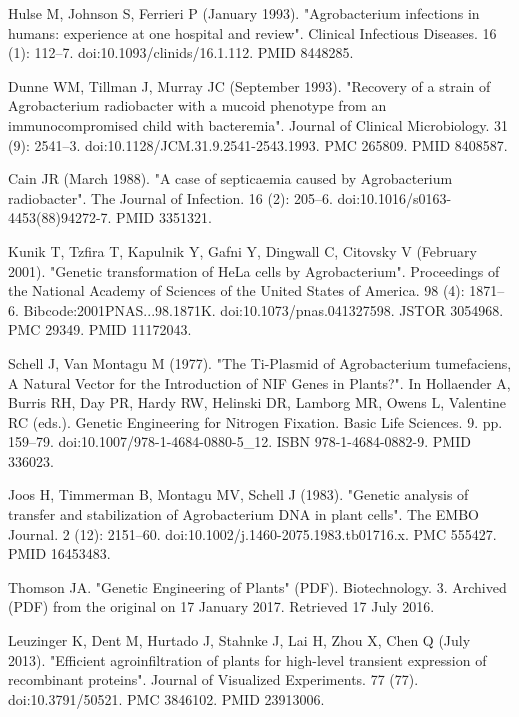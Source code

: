 \documentclass[11pt]{article}
\begin{document}
\begin{thebibliography}{3}
	 Hulse M, Johnson S, Ferrieri P (January 1993). "Agrobacterium infections in humans: experience at one hospital and review". Clinical Infectious Diseases. 16 (1): 112–7. doi:10.1093/clinids/16.1.112. PMID 8448285.
	
	 Dunne WM, Tillman J, Murray JC (September 1993). "Recovery of a strain of Agrobacterium radiobacter with a mucoid phenotype from an immunocompromised child with bacteremia". Journal of Clinical Microbiology. 31 (9): 2541–3. doi:10.1128/JCM.31.9.2541-2543.1993. PMC 265809. PMID 8408587.
	
	 Cain JR (March 1988). "A case of septicaemia caused by Agrobacterium radiobacter". The Journal of Infection. 16 (2): 205–6. doi:10.1016/s0163-4453(88)94272-7. PMID 3351321.
	
	 Kunik T, Tzfira T, Kapulnik Y, Gafni Y, Dingwall C, Citovsky V (February 2001). "Genetic transformation of HeLa cells by Agrobacterium". Proceedings of the National Academy of Sciences of the United States of America. 98 (4): 1871–6. Bibcode:2001PNAS...98.1871K. doi:10.1073/pnas.041327598. JSTOR 3054968. PMC 29349. PMID 11172043.
	
	 Schell J, Van Montagu M (1977). "The Ti-Plasmid of Agrobacterium tumefaciens, A Natural Vector for the Introduction of NIF Genes in Plants?". In Hollaender A, Burris RH, Day PR, Hardy RW, Helinski DR, Lamborg MR, Owens L, Valentine RC (eds.). Genetic Engineering for Nitrogen Fixation. Basic Life Sciences. 9. pp. 159–79. doi:10.1007/978-1-4684-0880-5\_12. ISBN 978-1-4684-0882-9. PMID 336023.
	
	 Joos H, Timmerman B, Montagu MV, Schell J (1983). "Genetic analysis of transfer and stabilization of Agrobacterium DNA in plant cells". The EMBO Journal. 2 (12): 2151–60. doi:10.1002/j.1460-2075.1983.tb01716.x. PMC 555427. PMID 16453483.
	
	 Thomson JA. "Genetic Engineering of Plants" (PDF). Biotechnology. 3. Archived (PDF) from the original on 17 January 2017. Retrieved 17 July 2016.
	
	 Leuzinger K, Dent M, Hurtado J, Stahnke J, Lai H, Zhou X, Chen Q (July 2013). "Efficient agroinfiltration of plants for high-level transient expression of recombinant proteins". Journal of Visualized Experiments. 77 (77). doi:10.3791/50521. PMC 3846102. PMID 23913006.
	

\end{thebibliography}
\end{document}
